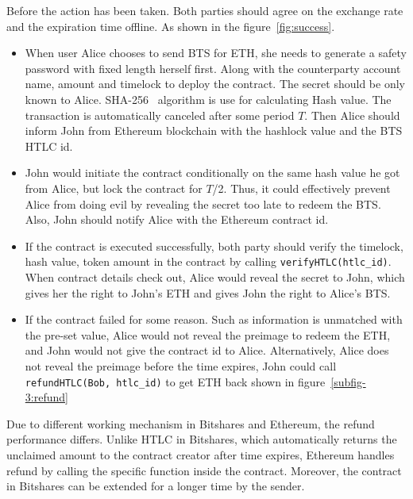 \noindent Before the action has been taken. Both parties should agree on the exchange rate and the expiration time offline. As shown in the figure~\ref{fig:success}.
\begin{itemize}
    \item When user Alice chooses to send BTS for ETH, she needs to generate a safety password with fixed length herself first. Along with the counterparty account name, amount and timelock to deploy the contract. The secret should be only known to Alice.  SHA-256~\cite{gallagher1995secure} algorithm is use for calculating Hash value. The transaction is automatically canceled after some period $T$. Then Alice should inform John from Ethereum blockchain with the hashlock value and the BTS HTLC id.
 
    \item John would initiate the contract conditionally on the same hash value he got from Alice, but lock the contract for $T$/2. Thus, it could effectively prevent Alice from doing evil by revealing the secret too late to redeem the BTS. Also, John should notify Alice with the Ethereum contract id.
    
    \item If the contract is executed successfully, both party should verify the timelock, hash value, token amount in the contract by calling \texttt{verifyHTLC(htlc\_id)}. When contract details check out, Alice would reveal the secret to John, which gives her the right to John's ETH and gives John the right to Alice's BTS.

    \item If the contract failed for some reason. Such as information is unmatched with the pre-set value, Alice would not reveal the preimage to redeem the ETH, and John would not give the contract id to Alice. Alternatively, Alice does not reveal the preimage before the time expires, John could call \texttt{refundHTLC(Bob, htlc\_id)} to get ETH back shown in figure~\ref{subfig-3:refund}

\end{itemize}
\noindent Due to different working mechanism in Bitshares and Ethereum, the refund performance differs. Unlike HTLC in Bitshares, which automatically returns the unclaimed amount to the contract creator after time expires, Ethereum handles refund by calling the specific function inside the contract. Moreover, the contract in Bitshares can be extended for a longer time by the sender. 

